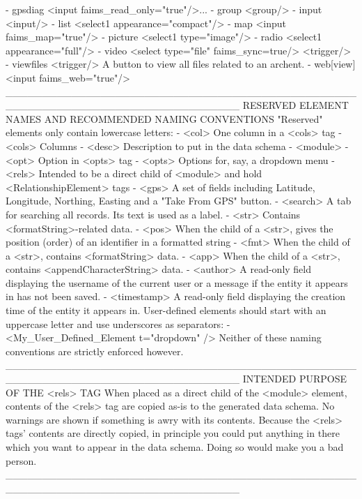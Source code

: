 \crlf
- gpsdiag <input faims_read_only="true"/>...\crlf
- group <group/>\crlf
- input <input/>\crlf
- list <select1 appearance="compact"/>\crlf
- map <input faims_map="true"/>\crlf
- picture <select1 type="image"/>\crlf
- radio <select1 appearance="full"/>\crlf
- video <select type="file" faims_sync=true/>\crlf
<trigger/>\crlf
- viewfiles <trigger/>\crlf
A button to view all files related to an archent.\crlf
- web{[}view{]} <input faims_web="true"/>\crlf
________________________________________________________________________________\crlf
\crlf
RESERVED ELEMENT NAMES AND RECOMMENDED NAMING CONVENTIONS\crlf
\crlf
"Reserved" elements only contain lowercase letters:\crlf
- <col> One column in a <cols> tag\crlf
- <cols> Columns\crlf
- <desc> Description to put in the data schema\crlf
- <module>\crlf
- <opt> Option in <opts> tag\crlf
- <opts> Options for, say, a dropdown menu\crlf
- <rels> Intended to be a direct child of <module> and hold\crlf
<RelationshipElement> tags\crlf
- <gps> A set of fields including Latitude, Longitude, Northing,\crlf
Easting and a "Take From GPS" button.\crlf
- <search> A tab for searching all records. Its text is used as a label.\crlf
- <str> Contains <formatString>-related data.\crlf
- <pos> When the child of a <str>, gives the position (order) of an\crlf
identifier in a formatted string\crlf
- <fmt> When the child of a <str>, contains <formatString> data.\crlf
- <app> When the child of a <str>, contains <appendCharacterString>\crlf
data.\crlf
- <author> A read-only field displaying the username of the current user\crlf
or a message if the entity it appears in has not been saved.\crlf
- <timestamp> A read-only field displaying the creation time of the entity\crlf
it appears in.\crlf
User-defined elements should start with an uppercase letter and use\crlf
underscores as separators:\crlf
- <My_User_Defined_Element t="dropdown" />\crlf
Neither of these naming conventions are strictly enforced however.\crlf
________________________________________________________________________________\crlf
\crlf
INTENDED PURPOSE OF THE <rels> TAG\crlf
\crlf
When placed as a direct child of the <module> element, contents of the <rels>\crlf
tag are copied as-is to the generated data schema. No warnings are shown if\crlf
something is awry with its contents.\crlf
\crlf
Because the <rels> tags' contents are directly copied, in principle you could\crlf
put anything in there which you want to appear in the data schema. Doing so\crlf
would make you a bad person.\crlf
________________________________________________________________________________\crlf
\crlf

